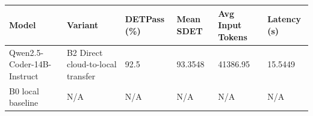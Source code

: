 \begin{tabular}{llllll}
\toprule
Model & Variant & DETPass (\%) & Mean SDET & Avg Input Tokens & Latency (s) \\
\midrule
Qwen2.5-Coder-14B-Instruct & B2 Direct cloud-to-local transfer & 92.5 & 93.3548 & 41386.95 & 15.5449 \\
B0 local baseline & N/A & N/A & N/A & N/A & N/A \\
\bottomrule
\end{tabular}
